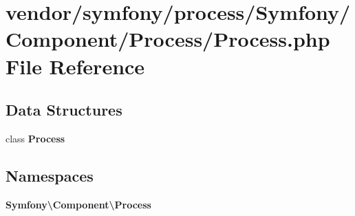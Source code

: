 \section{vendor/symfony/process/\+Symfony/\+Component/\+Process/\+Process.php File Reference}
\label{_process_8php}
\subsection*{Data Structures}
\begin{DoxyCompactItemize}
\item 
class {\bf Process}
\end{DoxyCompactItemize}
\subsection*{Namespaces}
\begin{DoxyCompactItemize}
\item 
 {\bf Symfony\textbackslash{}\+Component\textbackslash{}\+Process}
\end{DoxyCompactItemize}
